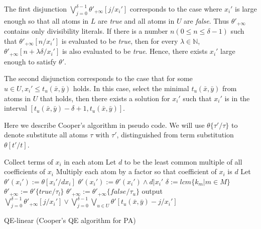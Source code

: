 The first disjunction $\bigvee_{j=0}^{\delta-1} \theta'_{+\infty}[j/x_i']$ corresponds to the case where $x_i'$ is large enough 
so that all atoms in $L$ are \textit{true} and all atoms in  $U$ are \textit{false}. Thus $\theta'_{+\infty}$  contains only divisibility literals.
If there is a number $n (0\le n \le \delta-1)$ such that $ \theta'_{+\infty}[n/x_i']$ is evaluated to be \textit{true},
then for every $\lambda\in \mathbb{N}$,
$\theta'_{+\infty}[n+\lambda\delta/x_i']$ is also evaluated to be \textit{true}.
Hence, there exists $x_i'$ large enough to satisfy $\theta'$.

The second disjunction corresponds to the case that for 
some $u\in U, x_i'\le t_u(\bar{x},\bar{y})$ holds.
In this case, 
select the minimal $t_u(\bar{x},\bar{y})$
from atoms in $U$ that holds,
then there exists a solution for $x_i'$ such that $x_i'$ is in the interval $[t_u(\bar{x},\bar{y})-\delta+1,t_u(\bar{x},\bar{y})]$.

Here we describe Cooper's algorithm in pseudo code.
We will use $\theta\{\tau'/\tau\}$ to denote substitute all atoms $\tau$ with $\tau'$,
distinguished from term substitution $\theta[t'/t]$.

\begin{algorithm}[t]
    \SetAlgoLined
    
    Collect terms of $x_i$ in each atom\;
    Let $d$ to be the least common multiple of all coefficients of $x_i$\;
    Multiply each atom by a factor so that coefficient of $x_i $ is $d$\;
    Let $\theta'(x_i'):= \theta[x_i'/dx_i]$\;
    $\theta'(x_i') := \theta'(x_i') \wedge d| x_i'$\;
    $\delta :=  lcm\{k_m|m\in M\}$\;
    {
        $\theta'_{+\infty}:=  \theta'\{\textit{true}/\tau_l\}$
    }
    {
        $\theta'_{+\infty}:=  \theta'_{+\infty}\{\textit{false}/\tau_u\}$
    }
    output $\bigvee_{j=0}^{\delta-1} \theta'_{+\infty}[j/x_i'] \vee \bigvee_{j=0}^{\delta-1} \bigvee_{u\in U}\theta'[t_u(\bar{x},\bar{y})-j/x_i']$
    \caption{QE-linear (Cooper's QE algorithm for PA)}
\end{algorithm}


